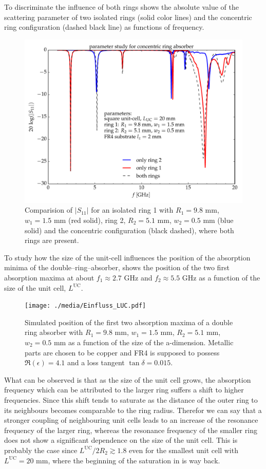 To discriminate the influence of both rings  shows the absolute value of the scattering parameter of two isolated rings (solid color lines) and the concentric ring configuration (dashed black line) as functions of frequency.

\begin{figure}
\centering
\includegraphics[width=0.75\linewidth]{./media/wifi_absorber_single_double_rings.pdf}
\caption{Comparision of $|S_{11}|$ for an isolated ring 1 with $R_1=9.8$ mm, $w_1=1.5$ mm (red solid), ring 2, $R_2=5.1$ mm, $w_2=0.5$ mm (blue solid) and the concentric configuration (black dashed), where both rings are present.}
\label{fig:single_double_rings}
\end{figure}

To study how the size of the unit-cell influences the position of the absorption 
minima of the double--ring--absorber,  shows the position of the two first absorption maxima at about $f_1\approx2.7$ GHz and $f_2\approx 5.5$ GHz as a function of the size of the unit cell, $L^\text{UC}$.
\begin{figure}
\centering
\texttt{[image: ./media/Einfluss\_LUC.pdf]}
\caption{Simulated position of the first two absorption maxima of a double ring absorber with $R_1=9.8$ mm, $w_1=1.5$ mm, $R_2=5.1$ mm, $w_2=0.5$ mm as a function of the size of the a-dimension. Metallic parts are chosen to be copper and FR4 is supposed to possess $\Re\left(\epsilon\right)=4.1$ and a loss tangent $\tan\delta = 0.015$.}
\label{fig:LUC}
\end{figure}

What can be observed is that as the size of the unit cell grows, the absorption frequency which can be attributed to the larger ring suffers a shift to higher frequencies. Since this shift tends to saturate as the distance of the outer ring to its neighbours becomes comparable to the ring radius. Therefor we can say that a stronger coupling of neighbouring unit cells leads to an increase of the resonance frequency of the larger ring, whereas the resonance frequency of the smaller ring does not show a significant dependence on the size of the unit cell. This is probably the case since $L^\mathrm{UC}/2 R_2\gtrsim 1.8$ even for the smallest unit cell with $L^\mathrm{UC}=20$ mm, where the beginning of the saturation in  is way back.

